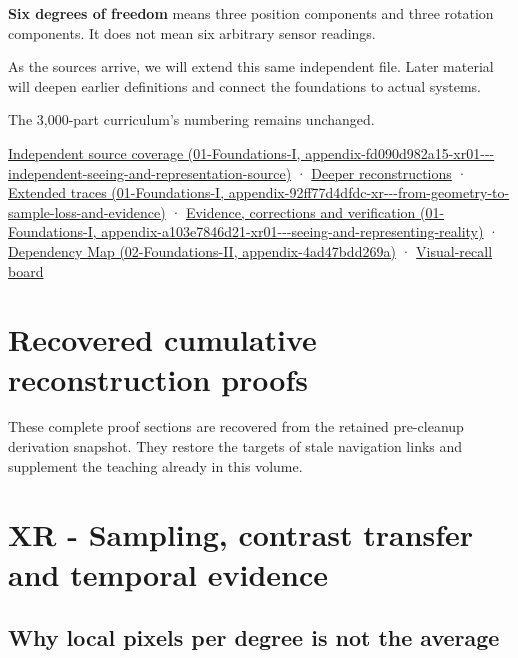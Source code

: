 \textbf{Six degrees of freedom} means three position components and three rotation components. It does not mean six arbitrary sensor readings.

As the sources arrive, we will extend this same independent file. Later material will deepen earlier definitions and connect the foundations to actual systems.

The 3,000-part curriculum's numbering remains unchanged.

\href{../01-Foundations-I/main.pdf\#nameddest=appendix-fd090d982a15-xr01---independent-seeing-and-representation-source}{Independent source coverage (01-Foundations-I, appendix-fd090d982a15-xr01-\/-\/-independent-seeing-and-representation-source)} · \hyperref[04-visual-computing-ii-ch042-xr---sampling-contrast-transfer-and-temporal-evidence]{Deeper reconstructions} · \href{../01-Foundations-I/main.pdf\#nameddest=appendix-92ff77d4dfdc-xr---from-geometry-to-sample-loss-and-evidence}{Extended traces (01-Foundations-I, appendix-92ff77d4dfdc-xr-\/-\/-from-geometry-to-sample-loss-and-evidence)} · \href{../01-Foundations-I/main.pdf\#nameddest=appendix-a103e7846d21-xr01---seeing-and-representing-reality}{Evidence, corrections and verification (01-Foundations-I, appendix-a103e7846d21-xr01-\/-\/-seeing-and-representing-reality)} · \href{../02-Foundations-II/main.pdf\#nameddest=appendix-4ad47bdd269a}{Dependency Map (02-Foundations-II, appendix-4ad47bdd269a)} · \hyperref[appendix-73c6b8ed5a87]{Visual-recall board}

\section{Recovered cumulative reconstruction proofs}\label{04-visual-computing-ii-ch043-recovered-cumulative-reconstruction-proofs}

These complete proof sections are recovered from the retained pre-cleanup derivation snapshot. They restore the targets of stale navigation links and supplement the teaching already in this volume.

\section{XR - Sampling, contrast transfer and temporal evidence}\label{04-visual-computing-ii-ch043-xr---sampling-contrast-transfer-and-temporal-evidence}

\subsection{Why local pixels per degree is not the average}\label{04-visual-computing-ii-ch043-why-local-pixels-per-degree-is-not-the-average}

